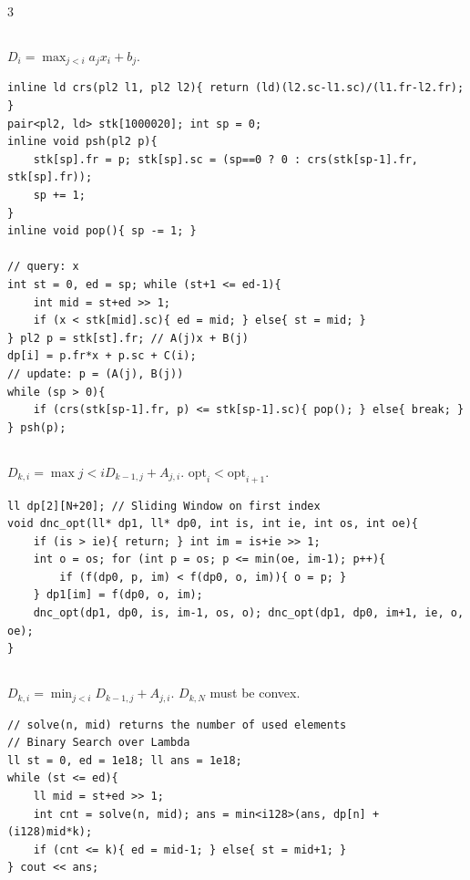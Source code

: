\documentclass[landscape, 8pt, a4paper, oneside]{extarticle}
\begin{document}
\begin{multicols*}{3}
\subsection{}
$D_i = \max_{j < i} a_j x_i + b_j$.

\begin{verbatim}
inline ld crs(pl2 l1, pl2 l2){ return (ld)(l2.sc-l1.sc)/(l1.fr-l2.fr); }
pair<pl2, ld> stk[1000020]; int sp = 0;
inline void psh(pl2 p){
	stk[sp].fr = p; stk[sp].sc = (sp==0 ? 0 : crs(stk[sp-1].fr, stk[sp].fr));
	sp += 1;
}
inline void pop(){ sp -= 1; }

// query: x
int st = 0, ed = sp; while (st+1 <= ed-1){
	int mid = st+ed >> 1;
	if (x < stk[mid].sc){ ed = mid; } else{ st = mid; }
} pl2 p = stk[st].fr; // A(j)x + B(j)
dp[i] = p.fr*x + p.sc + C(i);
// update: p = (A(j), B(j))
while (sp > 0){
	if (crs(stk[sp-1].fr, p) <= stk[sp-1].sc){ pop(); } else{ break; }
} psh(p);
\end{verbatim}
\subsection{}
$D_{k,i} = \max{j<i} D_{k-1,j} + A_{j,i}$. $\mathrm{opt}_i < \mathrm{opt}_{i+1}$.

\begin{verbatim}
ll dp[2][N+20]; // Sliding Window on first index
void dnc_opt(ll* dp1, ll* dp0, int is, int ie, int os, int oe){
	if (is > ie){ return; } int im = is+ie >> 1;
	int o = os; for (int p = os; p <= min(oe, im-1); p++){
		if (f(dp0, p, im) < f(dp0, o, im)){ o = p; }
	} dp1[im] = f(dp0, o, im);
	dnc_opt(dp1, dp0, is, im-1, os, o); dnc_opt(dp1, dp0, im+1, ie, o, oe);
}
\end{verbatim}
\subsection{}
$D_{k,i} = \min_{j<i} D_{k-1,j} + A_{j,i}$. $D_{k,N}$ must be convex.

\begin{verbatim}
// solve(n, mid) returns the number of used elements
// Binary Search over Lambda
ll st = 0, ed = 1e18; ll ans = 1e18;
while (st <= ed){
	ll mid = st+ed >> 1;
	int cnt = solve(n, mid); ans = min<i128>(ans, dp[n] + (i128)mid*k);
	if (cnt <= k){ ed = mid-1; } else{ st = mid+1; }
} cout << ans;
\end{verbatim}

\end{multicols*}
\end{document}
